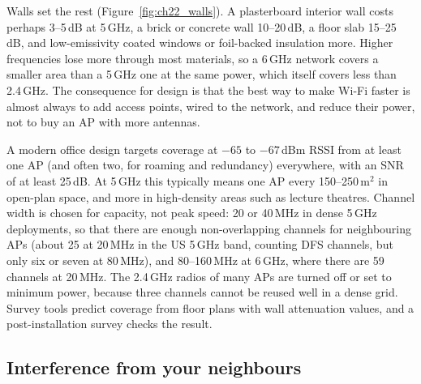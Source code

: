 
Walls set the rest (Figure~\ref{fig:ch22_walls}). A plasterboard interior wall costs perhaps 3--5\,dB
at 5\,GHz, a brick or concrete wall 10--20\,dB, a floor slab 15--25\,dB, and low-emissivity coated
windows or foil-backed insulation more. Higher frequencies lose more through most materials, so a
6\,GHz network covers a smaller area than a 5\,GHz one at the same power, which itself covers less
than 2.4\,GHz. The consequence for design is that the best way to make Wi-Fi faster is almost always
to add access points, wired to the network, and reduce their power, not to buy an AP with more
antennas.


\begin{inpractice}
A modern office design targets coverage at $-65$ to $-67$\,dBm RSSI from at least one AP (and often
two, for roaming and redundancy) everywhere, with an SNR of at least 25\,dB. At 5\,GHz this typically
means one AP every 150--250\,m$^2$ in open-plan space, and more in high-density areas such as
lecture theatres. Channel width is chosen for capacity, not peak speed: 20 or 40\,MHz in dense
5\,GHz deployments, so that there are enough non-overlapping channels for neighbouring APs (about 25
at 20\,MHz in the US 5\,GHz band, counting DFS channels, but only six or seven at 80\,MHz), and
80--160\,MHz at 6\,GHz, where there are 59 channels at 20\,MHz. The 2.4\,GHz radios of many APs are
turned off or set to minimum power, because three channels cannot be reused well in a dense grid.
Survey tools predict coverage from floor plans with wall attenuation values, and a
post-installation survey checks the result.
\end{inpractice}

\subsection{Interference from your neighbours}

